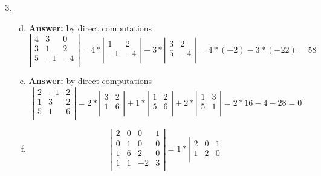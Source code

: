 \documentclass[8pt]{article} %
\begin{document}
\begin{enumerate}[1]
	\setcounter{enumi}{2}
	\item \begin{enumerate}[(a)]
	\setcounter{enumi}{3}
\item {\bf Answer: }by direct computations
\[\left|\begin{array}{rrr}
4&3&0\\
3&1&2\\
5&-1&-4\\
\end{array}\right|=
4*\left|\begin{array}{rr}
1&2\\
-1&-4\\
\end{array}\right|-3*
\left|\begin{array}{rr}
3&2\\
5&-4\\
\end{array}\right|=4*(-2)-3*(-22)=58
\]
	\setcounter{enumi}{5}
\item {\bf Answer: }by direct computations
\[\left|\begin{array}{rrr}
2&-1&2\\
1&3&2\\
5&1&6\\
\end{array}\right|=
2*
\left|\begin{array}{rr}
3&2\\
1&6\\
\end{array}\right|+1*
\left|\begin{array}{rr}
1&2\\
5&6\\
\end{array}\right|
+2*
\left|\begin{array}{rr}
1&3\\
5&1\\
\end{array}\right|=2*16-4-28=0\]
\item
	\[
\left|\begin{array}{rrrr}
2&0&0&1\\
0&1&0&0\\
1&6&2&0\\
1&1&-2&3\\
\end{array}\right|=1*
\left|\begin{array}{rrr}
2&0&1\\
1&2&0\\

\end{array}\]
\end{enumerate}
\end{enumerate}
\end{document}
